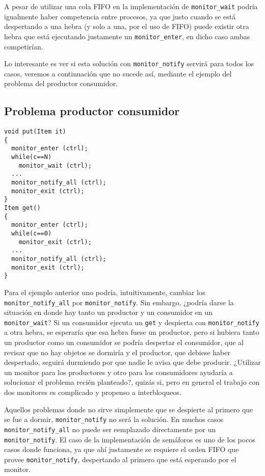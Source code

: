 A pesar de utilizar una cola FIFO en la implementación de \texttt{monitor\_wait}
podría igualmente haber competencia entre procesos, ya que justo cuando se está
despertando a una hebra (y solo a una, por el uso de FIFO) puede existir otra
hebra que está ejecutando justamente un \texttt{monitor\_enter}, en dicho caso
ambas competirían.

Lo interesante es ver si esta solución con \texttt{monitor\_notify} servirá para
todos los casos, veremos a continuación que no sucede así, mediante el ejemplo
del problema del productor consumidor.

\subsection{Problema productor consumidor}

\begin{lstlisting}
void put(Item it)
{
  monitor_enter (ctrl);
  while(c==N)
    monitor_wait (ctrl);
  ...
  monitor_notify_all (ctrl);
  monitor_exit (ctrl);
}
Item get()
{
  monitor_enter (ctrl);
  while(c==0)
    monitor_exit (ctrl);
  ...
  monitor_notify_all (ctrl);
  monitor_exit (ctrl);
}
\end{lstlisting}

Para el ejemplo anterior uno podría, intuitivamente, cambiar los
\texttt{monitor\_notify\_all} por \texttt{monitor\_notify}. Sin embargo, ¿podría
darse la situación en donde hay tanto un productor y un consumidor en un
\texttt{monitor\_wait}? Si un consumidor ejecuta un \texttt{get} y despierta con
\texttt{monitor\_notify} a otra hebra, se esperaría que esa hebra fuese un
productor, pero si hubiera tanto un productor como un consumidor se podría
despertar el consumidor, que al revisar que no hay objetos se dormiría y el
productor, que debiese haber despertado, seguirá durmiendo por que nadie le
avisa que debe producir. ¿Utilizar un monitor para los productores y otro para
los consumidores ayudaría a solucionar el problema recién planteado?, quizás
si, pero en general el trabajo con dos monitores es complicado y propenso a
interbloqueos.

Aquellos problemas donde no sirve simplemente que se despierte al primero que se
fue a dormir, \texttt{monitor\_notify} no será la solución. En muchos casos
\texttt{monitor\_notify\_all} no puede ser eemplazado directamente por un
\texttt{monitor\_notify}. El caso de la implementación de semáforos es uno de
los pocos casos donde funciona, ya que ahí justamente se requiere el orden FIFO
que provee \texttt{monitor\_notify}, despertando al primero que está esperando
por el monitor.

